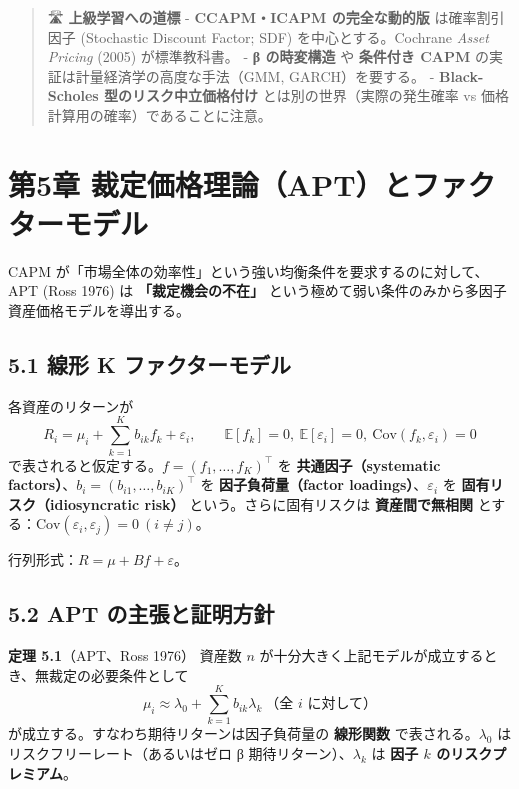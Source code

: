 \documentclass[11pt,a4paper]{report}
\begin{document}
\begin{quote}
🛣 \textbf{上級学習への道標}
- \textbf{CCAPM・ICAPM の完全な動的版} は確率割引因子 (Stochastic Discount Factor; SDF) を中心とする。Cochrane \emph{Asset Pricing} (2005) が標準教科書。
- \textbf{β の時変構造} や \textbf{条件付き CAPM} の実証は計量経済学の高度な手法（GMM, GARCH）を要する。
- \textbf{Black-Scholes 型のリスク中立価格付け} とは別の世界（実際の発生確率 vs 価格計算用の確率）であることに注意。
\end{quote}

\noindent\hrulefill

\chapter{第5章 裁定価格理論（APT）とファクターモデル}

CAPM が「市場全体の効率性」という強い均衡条件を要求するのに対して、APT (Ross 1976) は \textbf{「裁定機会の不在」} という極めて弱い条件のみから多因子資産価格モデルを導出する。

\section{5.1 線形 K ファクターモデル}

各資産のリターンが \[ R_i = \mu_i + \sum_{k=1}^K b_{ik} f_k + \varepsilon_i, \qquad \mathbb{E}[f_k] = 0,\ \mathbb{E}[\varepsilon_i] = 0,\ \mathrm{Cov}(f_k, \varepsilon_i) = 0 \] で表されると仮定する。$f = (f_1, \dots, f_K)^\top$ を \textbf{共通因子（systematic factors）}、$b_i = (b_{i1}, \dots, b_{iK})^\top$ を \textbf{因子負荷量（factor loadings）}、$\varepsilon_i$ を \textbf{固有リスク（idiosyncratic risk）} という。さらに固有リスクは \textbf{資産間で無相関} とする：$\mathrm{Cov}(\varepsilon_i, \varepsilon_j) = 0\ (i \neq j)$。

行列形式：$R = \mu + B f + \varepsilon$。

\section{5.2 APT の主張と証明方針}

\textbf{定理 5.1}（APT、Ross 1976） 資産数 $n$ が十分大きく上記モデルが成立するとき、無裁定の必要条件として \[ \boxed{\; \mu_i \approx \lambda_0 + \sum_{k=1}^K b_{ik} \lambda_k\ \text{（全 } i \text{ に対して）} \;} \] が成立する。すなわち期待リターンは因子負荷量の \textbf{線形関数} で表される。$\lambda_0$ はリスクフリーレート（あるいはゼロ β 期待リターン）、$\lambda_k$ は \textbf{因子 $k$ のリスクプレミアム}。
\end{document}
